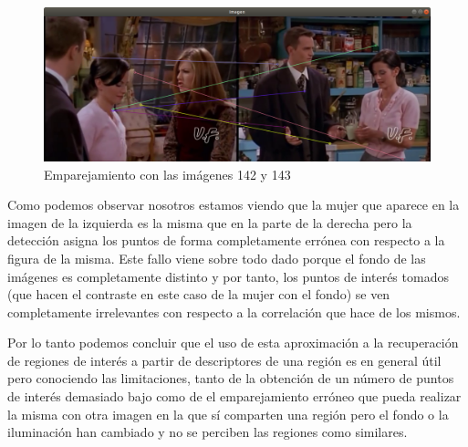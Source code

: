 \documentclass[12pt,a4paper]{article}
\begin{document}
\begin{figure}[H]
  \centering
  \includegraphics[scale=0.35]{./Imagenes/Ejercicio1-4.png}
  \caption{Emparejamiento con las imágenes 142 y 143}
\end{figure}

Como podemos observar nosotros estamos viendo que la mujer que aparece en la imagen de la izquierda es la misma que en la parte de la derecha pero la detección asigna los puntos de forma completamente errónea con respecto a la figura de la misma. Este fallo viene sobre todo dado porque el fondo de las imágenes es completamente distinto y por tanto, los puntos de interés tomados (que hacen el contraste en este caso de la mujer con el fondo) se ven completamente irrelevantes con respecto a la correlación que hace de los mismos.

\vspace{10px}

Por lo tanto podemos concluir que el uso de esta aproximación a la recuperación de regiones de interés a partir de descriptores de una región es en general útil pero conociendo las limitaciones, tanto de la obtención de un número de puntos de interés demasiado bajo como de el emparejamiento erróneo que pueda realizar la misma con otra imagen en la que sí comparten una región pero el fondo o la iluminación han cambiado y no se perciben las regiones como similares.
\end{document}
